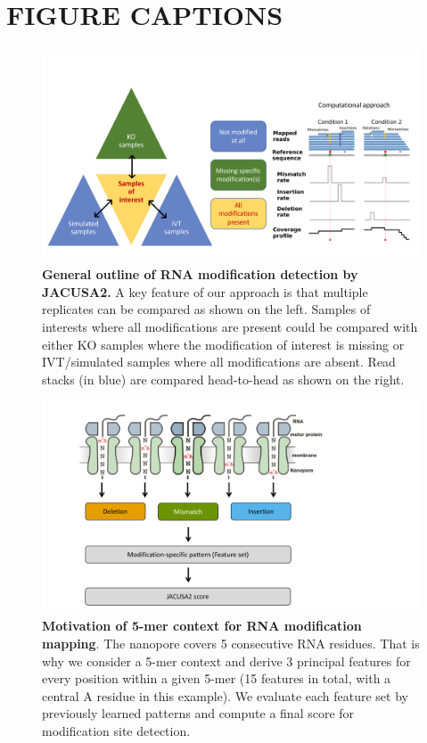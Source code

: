 \documentclass[times, 11pt, a4paper]{article}
\begin{document}
 

\newpage

\section*{FIGURE CAPTIONS}

\begin{figure}[h!]
    \includegraphics[width = 1\textwidth]{Figure1.pdf}
  \caption{\textbf{General outline of RNA modification detection by JACUSA2.} A key feature of our approach is that multiple replicates can be compared as shown on the left. Samples of interests where all modifications are present could be compared with either KO samples where the modification of interest is missing or IVT/simulated samples where all modifications are absent. Read stacks (in blue) are compared head-to-head as shown on the right. }
  \label{fig:graphicsummary}
      \end{figure}
\newpage

\begin{figure}[h!]
    \includegraphics[width = 1\textwidth]{Figure2.pdf}
  \caption{\textbf{Motivation of 5-mer context for RNA modification mapping}. The nanopore covers 5 consecutive RNA residues. That is why we consider a 5-mer context and derive 3 principal features for every position within a given 5-mer (15 features in total, with a central A residue in this example). We evaluate each feature set by previously learned patterns and compute a final score for modification site detection.}
  \label{fig:5mer}
      \end{figure}
\newpage
\end{document}
